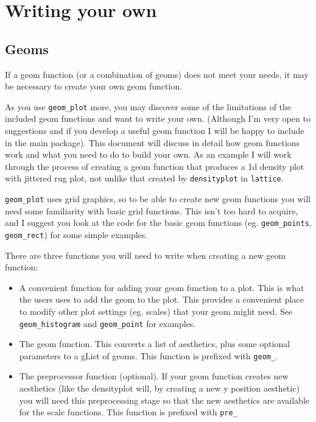 

\chapter{Writing your own}

\section{Geoms}\label{sec:writing_your_own}

If a geom function (or a combination of geoms) does not meet your needs, it may be necessary to create your own geom function.  

As you use {\tt geom\_plot} more, you may discover some of the limitations of the included geom functions and want to write your own.  (Although I'm very open to suggestions and if you develop a useful geom function I will be happy to include in the main package).  This document will discuss in detail how geom functions work and what you need to do to build your own.  As an example I will work through the process of creating a geom function that produces a 1d density plot with jittered rug plot, not unlike that created by {\tt densityplot} in {\tt lattice}.

{\tt geom\_plot} uses grid graphics, so to be able to create new geom functions you will need some familiarity with basic grid functions.  This isn't too hard to acquire, and I suggest you look at the code for the basic geom functions (eg. {\tt geom\_points}, {\tt geom\_rect}) for some simple examples.

There are three functions you will need to write when creating a new geom function:

\begin{itemize}
	\item A convenient function for adding your geom function to a plot.  This is what the users uses to add the geom to the plot.  This provides a convenient place to modify other plot settings (eg. scales) that your geom might need.  See {\tt geom\_histogram} and {\tt geom\_point} for examples.

	\item The geom function.  This converts a list of aesthetics, plus some optional parameters to a gList of geoms.  This function is prefixed with {\tt geom\_}.  
	
	\item The preprocessor function (optional).  If your geom function creates new aesthetics (like the densityplot will, by creating a new y position aesthetic) you will need this preprocessing stage so that the new aesthetics are available for the scale functions.  This function is prefixed with {\tt pre\_}
\end{itemize}

